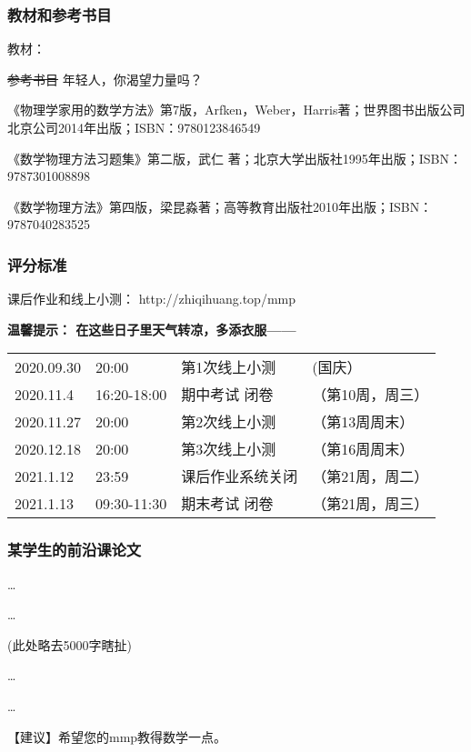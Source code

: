 \documentclass[CJK,13pt]{beamer}
\date{}
\begin{document}
  \bch
{}


\begin{frame}
\frametitle{教材和参考书目}

教材：

\skiplines

\sout{参考书目} 年轻人，你渴望力量吗？
\bitem
\item{《物理学家用的数学方法》第7版，Arfken，Weber，Harris著；世界图书出版公司北京公司2014年出版；ISBN：9780123846549}
\item{《数学物理方法习题集》第二版，武仁 著；北京大学出版社1995年出版；ISBN：9787301008898}
\item{《数学物理方法》第四版，梁昆淼著；高等教育出版社2010年出版；ISBN：9787040283525}
\eitem
      
\end{frame}




\begin{frame}
\frametitle{评分标准}


\skipline

课后作业和线上小测： http://zhiqihuang.top/mmp

\skipline

{\bf 温馨提示： 在这些日子里天气转凉，多添衣服——}

\skipline
{\small 
\begin{tabular}{llll}
2020.09.30 &20:00 & 第1次线上小测 & (国庆）\\    
2020.11.4 & 16:20-18:00 & 期中考试 闭卷 & （第10周，周三）\\
2020.11.27 &20:00 & 第2次线上小测 & （第13周周末）\\
2020.12.18 & 20:00 & 第3次线上小测 & （第16周周末）\\      
2021.1.12 &  23:59   &    课后作业系统关闭 & （第21周，周二） \\
2021.1.13 &  09:30-11:30 & 期末考试 闭卷 & （第21周，周三）
\end{tabular}
}
\end{frame}



\begin{frame}
  \frametitle{某学生的前沿课论文}
  
  \ldots

  \ldots  

  (此处略去5000字瞎扯)
  
  \ldots

  \ldots
  
【建议】希望您的mmp教得数学一点。

  
\end{frame}
\end{document}
